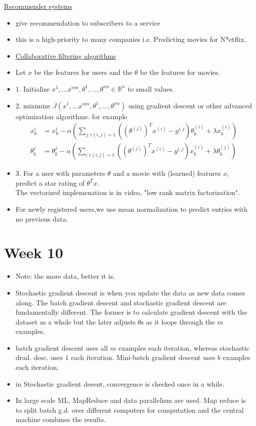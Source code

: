 \documentclass[12pt]{article}
\begin{document}
\underline{Recommender systems}
\begin{itemize}
	\item give recommendation to subscribers to a service
	\item this is a high-priority to many companies i.e. Predicting movies for N*etflix.
	\item \underline{Collaborative filtering algorithms}
	\item Let $x$ be the features for users and the $\theta$ be the features for movies.
	\item 1. Initialize $x^1, \ldots x^{nm},\theta^1,\ldots, \theta^{nu}\in \mathbb{R}^n$ to small values.
	\item 2. minimize $J(x^1, \ldots x^{nm},\theta^1,\ldots, \theta^{nu})$ using gradient descent or other advanced optimization algorithms. for example
	\begin{align*}
	x_k^i &= x_k^i - \alpha(\sum_{j:r(i,j)=1} ((\theta^{(j)})^Tx^{(i)} -y^{i,j})\theta_k^{(i)}+\lambda x_k^{(i)})\\
	\theta_k^j &= \theta_k^j - \alpha(\sum_{i:r(i,j)=1} ((\theta^{(j)})^Tx^{(i)} -y^{i,j})x_k^{(i)}+\lambda \theta_k^{(j)})
	\end{align*}
	\item 3. For a user with parameters $\theta$ and a movie with (learned) features $x$, predict a star rating of $\theta^Tx$.\\
	The vectorized implemenation is in video, "low rank matrix factorization".
	\item For newly registered users,we use mean normalization to predict entries with no previous data. 
	
\end{itemize}

\newpage \section*{Week 10}
\begin{itemize}
	\item Note: the more data, better it is.
	\item Stochastic gradient descent is when you update the data as new data comes along. The batch gradient descent and stochastic gradient descent are fundamentally different. The former is to calculate gradient descent with the dataset as a whole but the later adjusts $\theta$s as it loops through the $m$ examples.
	\item batch gradient descent uses all $m$ examples each iteration, whereas stochastic drad. desc. uses $1$ each iteration. Mini-batch gradient descent uses $b$ examples each iteration.
	\item in Stochastic gradient desent, convergence is checked once in a while.
	\item In large scale ML, MapReduce and data parallelism are used. Map reduce is to split batch g.d. over different computers for computation and the central machine combines the results.
\end{itemize}
\end{document}
